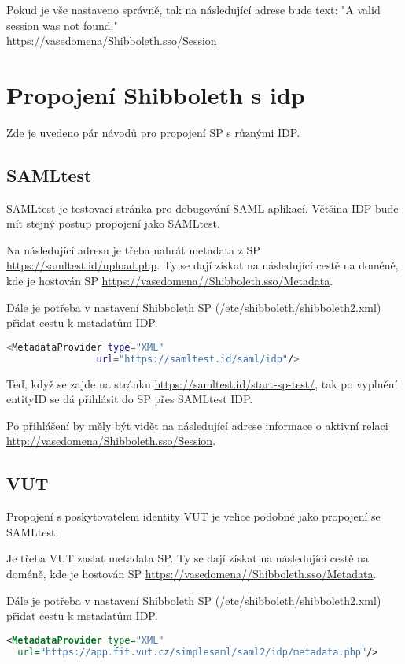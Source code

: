 Pokud je vše nastaveno správně, tak na následující adrese bude text: "A valid session was not found."\\
\url{https://vasedomena/Shibboleth.sso/Session}

\section{Propojení Shibboleth s idp}

Zde je uvedeno pár návodů pro propojení SP s různými IDP.

\subsection{SAMLtest}
SAMLtest je testovací stránka pro debugování SAML aplikací. Většina IDP bude mít stejný postup propojení jako SAMLtest.



Na následující adresu je třeba nahrát metadata z SP 
\url{https://samltest.id/upload.php}. Ty se dají získat na následující cestě na doméně, kde je hostován SP \url{https://vasedomena//Shibboleth.sso/Metadata}.

Dále je potřeba v nastavení Shibboleth SP (/etc/shibboleth/shibboleth2.xml) přidat cestu k metadatům IDP.
\begin{lstlisting}[language=Bash]
 <MetadataProvider type="XML"
                url="https://samltest.id/saml/idp"/>
\end{lstlisting}

Teď, když se zajde na stránku \url{https://samltest.id/start-sp-test/}, tak po vyplnění entityID se dá přihlásit do SP přes SAMLtest IDP.

Po přihlášení by měly být vidět na následující adrese informace o aktivní relaci \url{http://vasedomena/Shibboleth.sso/Session}.

\subsection{VUT}
Propojení s poskytovatelem identity VUT je velice podobné jako propojení se SAMLtest.



Je třeba VUT zaslat metadata SP. Ty se dají získat na následující cestě na doméně, kde je hostován SP \url{https://vasedomena//Shibboleth.sso/Metadata}.

Dále je potřeba v nastavení Shibboleth SP (/etc/shibboleth/shibboleth2.xml) přidat cestu k metadatům IDP.
\begin{lstlisting}[language=XML]
 <MetadataProvider type="XML"
  url="https://app.fit.vut.cz/simplesaml/saml2/idp/metadata.php"/>
\end{lstlisting}

